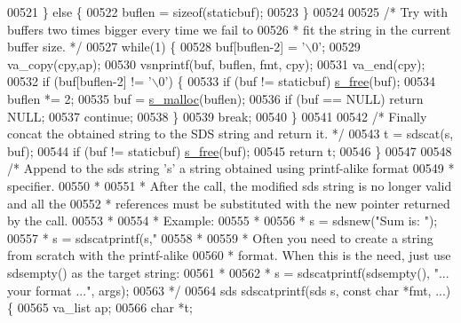 \begin{DoxyCode}
{{00521     \} \textcolor{keywordflow}{else} \{
00522         buflen = \textcolor{keyword}{sizeof}(staticbuf);
00523     \}
00524 
00525     \textcolor{comment}{/* Try with buffers two times bigger every time we fail to}
00526 \textcolor{comment}{     * fit the string in the current buffer size. */}
00527     \textcolor{keywordflow}{while}(1) \{
00528         buf[buflen-2] = \textcolor{stringliteral}{'\(\backslash\)0'};
00529         va\_copy(cpy,ap);
00530         vsnprintf(buf, buflen, fmt, cpy);
00531         va\_end(cpy);
00532         \textcolor{keywordflow}{if} (buf[buflen-2] != \textcolor{stringliteral}{'\(\backslash\)0'}) \{
00533             \textcolor{keywordflow}{if} (buf != staticbuf) \hyperlink{sdsalloc_8h_aa06cb49194c292098a753d87e2ac6b71}{s\_free}(buf);
00534             buflen *= 2;
00535             buf = \hyperlink{sdsalloc_8h_a41e8c1188dca30db85c410c25fb417b6}{s\_malloc}(buflen);
00536             \textcolor{keywordflow}{if} (buf == NULL) \textcolor{keywordflow}{return} NULL;
00537             \textcolor{keywordflow}{continue};
00538         \}
00539         \textcolor{keywordflow}{break};
00540     \}
00541 
00542     \textcolor{comment}{/* Finally concat the obtained string to the SDS string and return it. */}
00543     t = sdscat(s, buf);
00544     \textcolor{keywordflow}{if} (buf != staticbuf) \hyperlink{sdsalloc_8h_aa06cb49194c292098a753d87e2ac6b71}{s\_free}(buf);
00545     \textcolor{keywordflow}{return} t;
00546 \}
00547 
00548 \textcolor{comment}{/* Append to the sds string 's' a string obtained using printf-alike format}
00549 \textcolor{comment}{ * specifier.}
00550 \textcolor{comment}{ *}
00551 \textcolor{comment}{ * After the call, the modified sds string is no longer valid and all the}
00552 \textcolor{comment}{ * references must be substituted with the new pointer returned by the call.}
00553 \textcolor{comment}{ *}
00554 \textcolor{comment}{ * Example:}
00555 \textcolor{comment}{ *}
00556 \textcolor{comment}{ * s = sdsnew("Sum is: ");}
00557 \textcolor{comment}{ * s = sdscatprintf(s,"%
00558 \textcolor{comment}{ *}
00559 \textcolor{comment}{ * Often you need to create a string from scratch with the printf-alike}
00560 \textcolor{comment}{ * format. When this is the need, just use sdsempty() as the target string:}
00561 \textcolor{comment}{ *}
00562 \textcolor{comment}{ * s = sdscatprintf(sdsempty(), "... your format ...", args);}
00563 \textcolor{comment}{ */}
00564 sds sdscatprintf(sds s, \textcolor{keyword}{const} \textcolor{keywordtype}{char} *fmt, ...) \{
00565     va\_list ap;
00566     \textcolor{keywordtype}{char} *t;
}}}
\end{DoxyCode}
